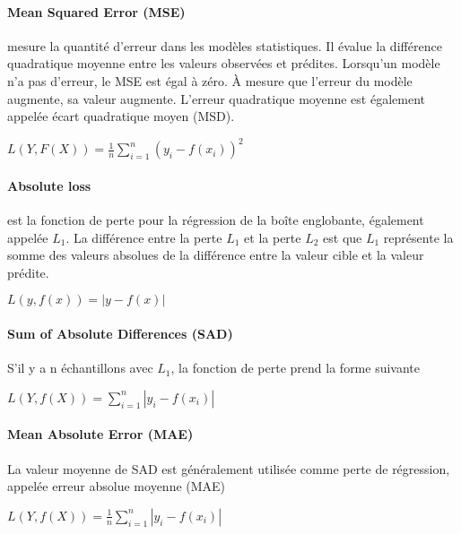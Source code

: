           \paragraph{Mean Squared Error (MSE)}
          mesure la quantité d'erreur dans les modèles statistiques. Il évalue la différence quadratique moyenne entre les valeurs observées et prédites. Lorsqu'un modèle n'a pas d'erreur, le MSE est égal à zéro. À mesure que l'erreur du modèle augmente, sa valeur augmente. L'erreur quadratique moyenne est également appelée écart quadratique moyen (MSD).
          \begin{center} $L(Y, F(X)) = \frac{1}{n}\sum_{i=1}^{n}(y_i - f(x_i))^2$ \end{center}

          \paragraph{Absolute loss}
          est la fonction de perte pour la régression de la boîte englobante, également appelée $L_1$. La différence entre la perte $L_1$ et la perte $L_2$ est que $L_1$ représente la somme des valeurs absolues de la différence entre la valeur cible et la valeur prédite.
          \begin{center} $L(y, f(x))=|y-f(x)|$ \end{center}

          \paragraph{Sum of Absolute Differences (SAD)}
          S'il y a n échantillons avec $L_1$, la fonction de perte prend la forme suivante
          \begin{center} $L(Y, f(X))=\sum_{i=1}^{n}|y_i-f(x_i)|$ \end{center}

          \paragraph{Mean Absolute Error (MAE)}
          La valeur moyenne de SAD est généralement utilisée comme perte de régression, appelée erreur absolue moyenne (MAE)
          \begin{center} $L(Y, f(X))=\frac{1}{n}\sum_{i=1}^{n}|y_i-f(x_i)|$ \end{center}


